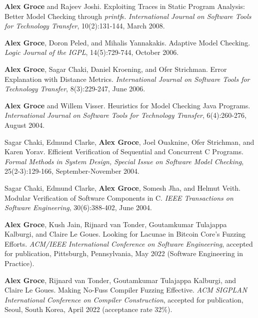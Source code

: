 \documentclass[ComputerScience]{vita}
\begin{document}
\begin{vita}
\begin{Refereed Journal Publications}
\item
{\bf Alex Groce} and Rajeev Joshi.
\newblock Exploiting Traces in Static Program Analysis: Better Model Checking through \emph{printf}s.
\newblock \emph{International Journal on Software Tools for Technology Transfer}, 10(2):131-144, March 2008.

\item
{\bf Alex Groce}, Doron Peled, and Mihalis Yannakakis.
\newblock Adaptive Model Checking.
\newblock \emph{Logic Journal of the IGPL}, 14(5):729-744, October 2006.

\item
{\bf Alex Groce}, Sagar Chaki, Daniel Kroening, and Ofer Strichman.
\newblock Error Explanation with Distance Metrics.
\newblock \emph{International Journal on Software Tools for Technology Transfer}, 8(3):229-247, June 2006.

\item
{\bf Alex Groce} and Willem Visser.
\newblock Heuristics for Model Checking Java Programs.
\newblock \emph{International Journal on Software Tools for Technology Transfer}, 6(4):260-276, August 2004.


\item
Sagar Chaki, Edmund Clarke, {\bf Alex Groce}, Joel Ouaknine, Ofer Strichman, and Karen Yorav.
\newblock Efficient Verification of Sequential and Concurrent C Programs.
\newblock \emph{Formal Methods in System Design, Special Issue on Software Model Checking}, 25(2-3):129-166, September-November 2004.

\item
Sagar Chaki, Edmund Clarke, {\bf Alex Groce}, Somesh Jha, and Helmut Veith.
\newblock Modular Verification of Software Components in C.
\newblock \emph{IEEE Transactions on Software Engineering}, 30(6):388-402, June 2004.

\end{Refereed Journal Publications}

\begin{Refereed Conference and Workshop Publications}
  
\item {\bf Alex Groce}, Kush Jain, Rijnard van Tonder, Goutamkumar
    Tulajappa Kalburgi, and Claire Le Goues.
    \newblock Looking for Lacunae in Bitcoin Core’s Fuzzing Efforts.
    \newblock \emph{ACM/IEEE International Conference on Software
      Engineering}, accepted for publication, Pittsburgh,
    Pennsylvania, May 2022 (Software Engineering in Practice).
    
\item {\bf Alex Groce}, Rijnard van Tonder, Goutamkumar
  Tulajappa Kalburgi, and Claire Le Goues.
  \newblock Making No-Fuss Compiler Fuzzing Effective.
  \newblock \emph{ACM SIGPLAN International Conference
on Compiler Construction}, accepted for publication, Seoul, South
Korea, April 2022 (acceptance rate 32\%).


\end{Refereed Conference and Workshop Publications}
\end{vita}
\end{document}
